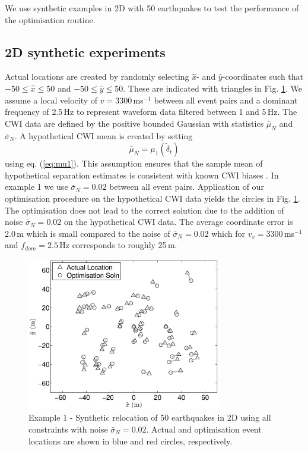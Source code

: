 \documentclass[extra]{gji}
\begin{document}
We use synthetic examples in 2D with 50 earthquakes to test the performance of the optimisation
routine.

\subsection{2D synthetic experiments}

Actual locations are created by
randomly selecting $\hat{x}$- and $\hat{y}$-coordinates such that $-50 \leq \hat{x} \leq 50$ and $-50 \leq \hat{y} \leq 50$.
These are indicated with triangles in Fig. \ref{fig-2D50eq-relocation_eg1}.
 We assume a local velocity of $v=3300\,$ms$^{-1}$ between all
event pairs and a dominant frequency of 2.5$\,$Hz to represent waveform data filtered between 1 and 5$\,$Hz.
The CWI data are defined by the positive bounded Gaussian with statistics
$\bar{\mu}_N$ and $\bar{\sigma}_N$. A hypothetical CWI mean is created by setting
\begin{equation}
\label{eq:hypothetical-CWI-mean-optichapt}
\bar{\mu}_N = \mu_1 \left( \widetilde{\delta}_t \right)
\end{equation}
using eq. (\ref{eq:mu1}). This assumption ensures that
the sample mean of hypothetical separation estimates is consistent with known CWI
biases \citep{dr_Robinson10b}. In example 1 we use $\bar{\sigma}_N=0.02$ between all event pairs.
Application of our optimisation procedure on the hypothetical CWI data yields the circles
in Fig. \ref{fig-2D50eq-relocation_eg1}. The optimisation does not lead to the correct
solution due to the addition of noise $\bar{\sigma}_N=0.02$ on the hypothetical
CWI data. The average coordinate error
is 2.0\,m which is small compared to the noise of $\bar{\sigma}_N=0.02$ which for
$v_s=3300$\,ms$^{-1}$ and $f_{dom}=2.5$\,Hz corresponds to roughly 25\,m.
\begin{figure}
\includegraphics[width = 20pc]{diags/locs_2D_50eq_1.eps}
\caption{Example 1 - Synthetic relocation of 50 earthquakes in 2D using all constraints with noise $\bar{\sigma}_N=0.02$.
Actual and optimisation event locations
are shown in blue and red circles, respectively.}
\label{fig-2D50eq-relocation_eg1}
\end{figure}
\end{document}
